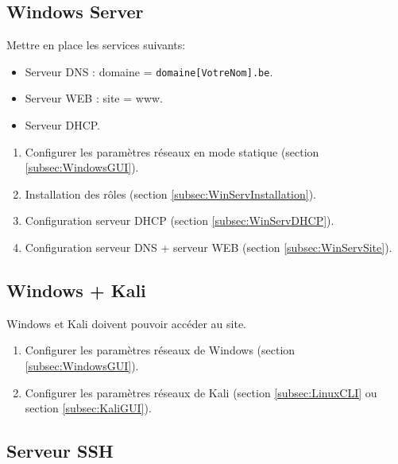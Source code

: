 \documentclass[a4paper]{article}
\renewcommand{\tt}{\texttt}
\begin{document}
\subsection{Windows Server}

Mettre en place les services suivants:
\begin{itemize}
    \item Serveur DNS : domaine = \tt{domaine[VotreNom].be}.
    \item Serveur WEB : site = www.
    \item Serveur DHCP.
\end{itemize}

\begin{example}
\begin{enumerate}
    \item Configurer les paramètres réseaux en mode statique (section \ref{subsec:WindowsGUI}).
    \item Installation des rôles (section \ref{subsec:WinServInstallation}).
    \item Configuration serveur DHCP (section \ref{subsec:WinServDHCP}).
    \item Configuration serveur DNS + serveur WEB (section \ref{subsec:WinServSite}).
\end{enumerate}
\end{example}





\subsection{Windows + Kali}

Windows et Kali doivent pouvoir accéder au site.

\begin{example}
\begin{enumerate}
    \item Configurer les paramètres réseaux de Windows (section \ref{subsec:WindowsGUI}).
    \item Configurer les paramètres réseaux de Kali (section \ref{subsec:LinuxCLI} ou section \ref{subsec:KaliGUI}).
\end{enumerate}
\end{example}





\subsection{Serveur SSH}
\end{document}
